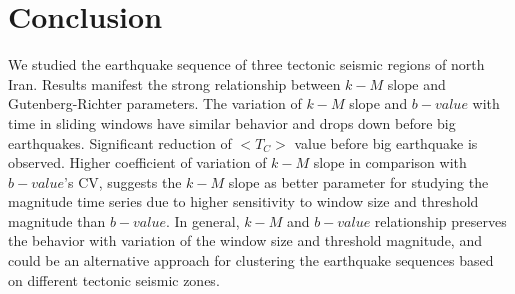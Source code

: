 
\section{Conclusion}
We studied the earthquake sequence of three tectonic seismic regions of north Iran. Results manifest the strong relationship between $k-M$ slope and Gutenberg-Richter parameters. The variation of $k-M$ slope and $b-value$ with time in sliding windows have similar behavior and drops down before big earthquakes. Significant reduction of $<T_C>$ value before big earthquake is observed. Higher coefficient of variation of $k-M$ slope in comparison with $b-value$'s CV, suggests the $k-M$ slope as better parameter for studying the magnitude time series due to higher sensitivity to window size and threshold magnitude than $b-value$. In general, $k-M$ and $b-value$ relationship preserves the behavior with variation of the window size and threshold magnitude, and could be an alternative approach for clustering the earthquake sequences based on different tectonic seismic zones.